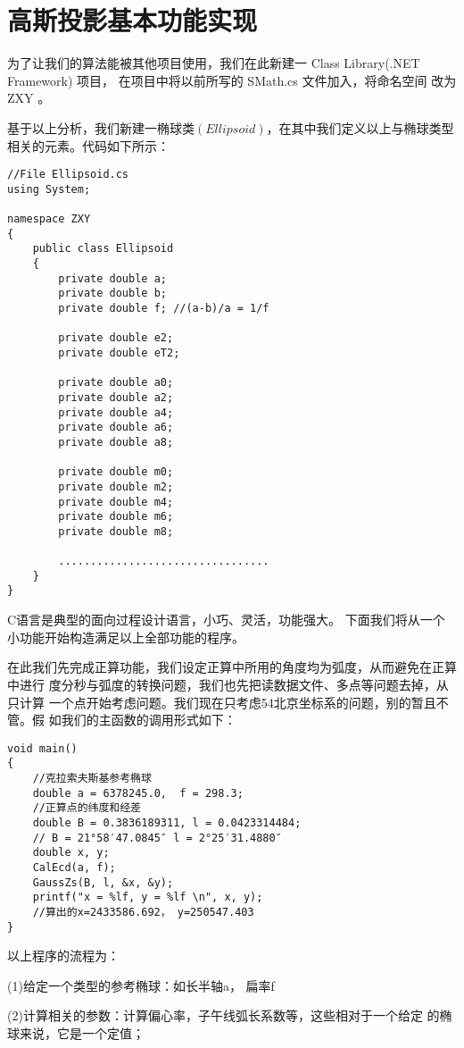 \section{高斯投影基本功能实现}

为了让我们的算法能被其他项目使用，我们在此新建一 Class Library(.NET Framework) 项目，
在项目中将以前所写的 SMath.cs 文件加入，将命名空间
改为 ZXY 。

基于以上分析，我们新建一椭球类$(Ellipsoid)$，在其中我们定义以上与椭球类型
相关的元素。代码如下所示：
\begin{verbatim}
//File Ellipsoid.cs
using System;

namespace ZXY
{
    public class Ellipsoid
    {
        private double a;
        private double b;
        private double f; //(a-b)/a = 1/f

        private double e2;
        private double eT2;

        private double a0;
        private double a2;
        private double a4;
        private double a6;
        private double a8;

        private double m0;
        private double m2;
        private double m4;
        private double m6;
        private double m8;

        .................................
    }
}
\end{verbatim}

C语言是典型的面向过程设计语言，小巧、灵活，功能强大。
下面我们将从一个小功能开始构造满足以上全部功能的程序。

在此我们先完成正算功能，我们设定正算中所用的角度均为弧度，从而避免在正算中进行
度分秒与弧度的转换问题，我们也先把读数据文件、多点等问题去掉，从只计算
一个点开始考虑问题。我们现在只考虑54北京坐标系的问题，别的暂且不管。假
如我们的主函数的调用形式如下：
\begin{verbatim}
void main()
{
    //克拉索夫斯基参考椭球
    double a = 6378245.0,  f = 298.3;
    //正算点的纬度和经差
    double B = 0.3836189311, l = 0.0423314484;
    // B = 21°58′47.0845″ l = 2°25′31.4880″
    double x, y;
    CalEcd(a, f);
    GaussZs(B, l, &x, &y);
    printf("x = %lf, y = %lf \n", x, y);
    //算出的x=2433586.692， y=250547.403
}
\end{verbatim}

以上程序的流程为：

(1)给定一个类型的参考椭球：如长半轴a， 扁率f

(2)计算相关的参数：计算偏心率，子午线弧长系数等，这些相对于一个给定
的椭球来说，它是一个定值；

